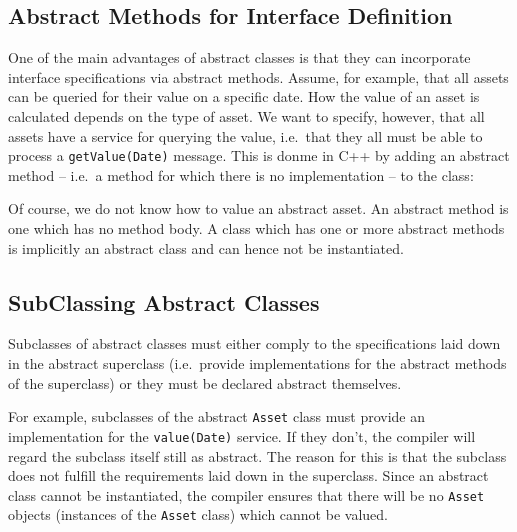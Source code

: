
\subsection{Abstract Methods for Interface Definition}

One of the main advantages of abstract classes is that they can incorporate
interface specifications via abstract methods. Assume, for example, that
all assets can be queried for their value on a specific date. How the 
value of an asset is calculated depends on the type of asset. 
We want to specify, 
however, that all assets have a service for querying the value, i.e.\
that they all must be able to process a \verb+getValue(Date)+ message. 
This is donme in C++ by adding an abstract method -- i.e.\ a method for
which there is no implementation -- to the class:


\noindent
Of course, we do not know how to value an 
abstract asset. An abstract method is one which has no method body. A
class which has one or more abstract methods is implicitly an abstract
class and can hence not be instantiated. 


\subsection{SubClassing Abstract Classes}

Subclasses of abstract classes must either comply to the specifications
laid down in the abstract superclass (i.e.\ provide implementations for 
the abstract methods of the superclass) or they must be declared abstract
themselves. 

For example, subclasses of the abstract \verb+Asset+ class must provide
an implementation for the \verb+value(Date)+ service. If they don't, the
compiler will regard the subclass itself still as abstract. The reason 
for this is that the subclass does not fulfill the requirements
laid down in the superclass. Since an abstract class cannot be instantiated,
the compiler ensures that there will be no \verb+Asset+ objects (instances
of the \verb+Asset+ class) which cannot be valued.

